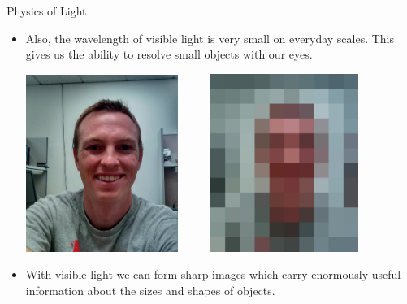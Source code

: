 \documentclass{beamer}
\begin{document}
\begin{frame}{Physics of Light}
   \begin{itemize}
      \item Also, the wavelength of visible light is very small on everyday scales. This gives us the ability to resolve small objects with our eyes.
      \begin{center}
      \includegraphics[width=0.39\textwidth]{figures/me.jpg}
      ~ ~ ~
      \includegraphics[width=0.38\textwidth]{figures/me_blur.jpeg}
      \end{center}
      \item With visible light we can form sharp images which carry enormously useful information about the sizes and shapes of objects.
   \end{itemize}
\end{frame}
\end{document}
